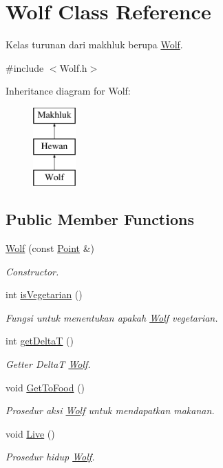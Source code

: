 \hypertarget{class_wolf}{}\section{Wolf Class Reference}
\label{class_wolf}


Kelas turunan dari makhluk berupa \hyperlink{class_wolf}{Wolf}.  




{\ttfamily \#include $<$Wolf.\+h$>$}

Inheritance diagram for Wolf\+:\begin{figure}[H]
\begin{center}
\leavevmode
\includegraphics[height=3.000000cm]{class_wolf}
\end{center}
\end{figure}
\subsection*{Public Member Functions}
\begin{DoxyCompactItemize}
\item 
\hyperlink{class_wolf_adb38a4364ecc382ae56e26a2e3f9d7c2}{Wolf} (const \hyperlink{class_point}{Point} \&)
\begin{DoxyCompactList}\small\item\em Constructor. \end{DoxyCompactList}\item 
int \hyperlink{class_wolf_a59589099b9226c3b85fa9c5fb8e51836}{is\+Vegetarian} ()
\begin{DoxyCompactList}\small\item\em Fungsi untuk menentukan apakah \hyperlink{class_wolf}{Wolf} vegetarian. \end{DoxyCompactList}\item 
int \hyperlink{class_wolf_aaab51ccea5bdd26c25ad61e7cb8991a6}{get\+DeltaT} ()
\begin{DoxyCompactList}\small\item\em Getter DeltaT \hyperlink{class_wolf}{Wolf}. \end{DoxyCompactList}\item 
void \hyperlink{class_wolf_a832902ad559bbf8a73bbe16d3378ba86}{Get\+To\+Food} ()
\begin{DoxyCompactList}\small\item\em Prosedur aksi \hyperlink{class_wolf}{Wolf} untuk mendapatkan makanan. \end{DoxyCompactList}\item 
void \hyperlink{class_wolf_a5902349f953664a4d53cc3ddea4b19f3}{Live} ()
\begin{DoxyCompactList}\small\item\em Prosedur hidup \hyperlink{class_wolf}{Wolf}. \end{DoxyCompactList}\end{DoxyCompactItemize}
